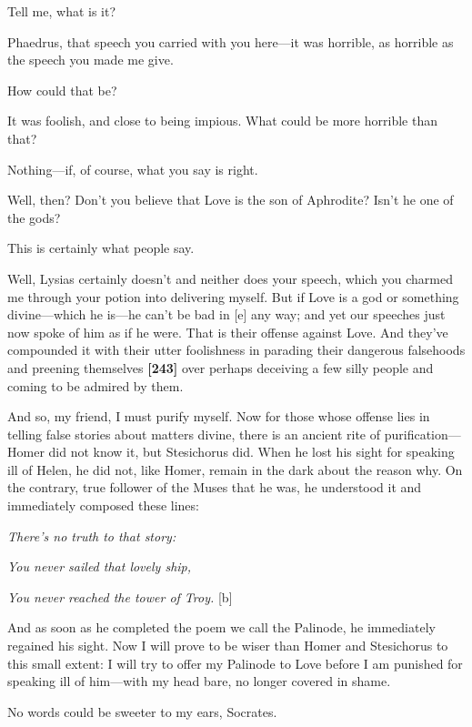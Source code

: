 \sayphaedrus Tell me, what is it?

\saysocrates Phaedrus, that speech you carried with you here---it was
horrible, as horrible as the speech you made me give.

\sayphaedrus How could that be?

\saysocrates It was foolish, and close to being impious. What could be more
horrible than that?

\sayphaedrus Nothing---if, of course, what you say is right.

\saysocrates Well, then? Don't you believe that Love is the son of
Aphrodite? Isn't he one of the gods?

\sayphaedrus This is certainly what people say.

\saysocrates Well, Lysias certainly doesn't and neither does your speech,
which you charmed me through your potion into delivering myself. But if
Love is a god or something divine---which he is---he can't be bad in
{[}e{]} any way; and yet our speeches just now spoke of him as if he
were. That is their offense against Love. And they've compounded it with
their utter foolishness in parading their dangerous falsehoods and
preening themselves {\bf {[}243{]}} over perhaps deceiving a few silly
people and coming to be admired by them.

And so, my friend, I must purify myself. Now for those whose offense
lies in telling false stories about matters divine, there is an ancient
rite of purification---Homer did not know it, but Stesichorus did. When
he lost his sight for speaking ill of Helen, he did not, like Homer,
remain in the dark about the reason why. On the contrary, true follower
of the Muses that he was, he understood it and immediately composed
these lines:\crlf
\crlf

{\em There's no truth to that story:}

{\em You never sailed that lovely ship,}

{\em You never reached the tower of
Troy.} {[}b{]}\crlf
\crlf

And as soon as he completed the poem we call the Palinode, he
immediately regained his sight. Now I will prove to be wiser than Homer
and Stesichorus to this small extent: I will try to offer my Palinode to
Love before I am punished for speaking ill of him---with my head bare,
no longer covered in shame.

\sayphaedrus No words could be sweeter to my ears, Socrates.

